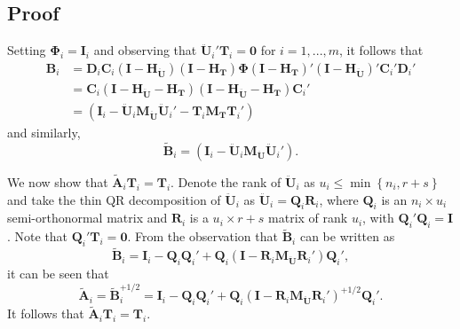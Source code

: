 \documentclass[12pt]{article}
\begin{document}
\hypertarget{proof}{%
\subsection{Proof}\label{proof}}

Setting \(\boldsymbol\Phi_i = \mathbf{I}_i\) and observing that
\(\mathbf{\ddot{U}}_i'\mathbf{T}_i = \mathbf{0}\) for \(i = 1,...,m\),
it follows that \begin{align}
\mathbf{B}_i &= \mathbf{D}_i \mathbf{C}_i \left(\mathbf{I} - \mathbf{H_{\ddot{U}}}\right) \left(\mathbf{I} - \mathbf{H_T}\right) \boldsymbol\Phi \left(\mathbf{I} - \mathbf{H_T}\right)' \left(\mathbf{I} - \mathbf{H_{\ddot{U}}}\right)' \mathbf{C}_i' \mathbf{D}_i' \nonumber \\ 
&= \mathbf{C}_i \left(\mathbf{I} - \mathbf{H_{\ddot{U}}} - \mathbf{H_T}\right) \left(\mathbf{I} - \mathbf{H_{\ddot{U}}} - \mathbf{H_T}\right) \mathbf{C}_i' \nonumber\\ 
\label{eq:B_i}
&= \left(\mathbf{I}_i - \mathbf{\ddot{U}}_i \mathbf{M_{\ddot{U}}}\mathbf{\ddot{U}}_i' - \mathbf{T}_i \mathbf{M_T}\mathbf{T}_i'\right)
\end{align} and similarly, \begin{equation}
\label{eq:Btilde_i}
\tilde{\mathbf{B}}_i = \left(\mathbf{I}_i - \mathbf{\ddot{U}}_i \mathbf{M_{\ddot{U}}}\mathbf{\ddot{U}}_i'\right).
\end{equation}

We now show that \(\tilde{\mathbf{A}}_i \mathbf{T}_i = \mathbf{T}_i\).
Denote the rank of \(\mathbf{\ddot{U}}_i\) as
\(u_i \leq \min \left\{n_i, r + s \right\}\) and take the thin QR
decomposition of \(\mathbf{\ddot{U}}_i\) as
\(\mathbf{\ddot{U}}_i = \mathbf{Q}_i \mathbf{R}_i\), where
\(\mathbf{Q}_i\) is an \(n_i \times u_i\) semi-orthonormal matrix and
\(\mathbf{R}_i\) is a \(u_i \times r + s\) matrix of rank \(u_i\), with
\(\mathbf{Q}_i'\mathbf{Q}_i = \mathbf{I}\). Note that
\(\mathbf{Q}_i'\mathbf{T}_i = \mathbf{0}\). From the observation that
\(\tilde{\mathbf{B}}_i\) can be written as \[
\tilde{\mathbf{B}}_i = \mathbf{I}_i - \mathbf{Q}_i \mathbf{Q}_i' + \mathbf{Q}_i \left(\mathbf{I} - \mathbf{R}_i \mathbf{M}_{\mathbf{\ddot{U}}} \mathbf{R}_i'\right)\mathbf{Q}_i',
\] it can be seen that \begin{equation}
\tilde{\mathbf{A}}_i = \tilde{\mathbf{B}}_i^{+1/2} = \mathbf{I}_i - \mathbf{Q}_i \mathbf{Q}_i' + \mathbf{Q}_i \left(\mathbf{I} - \mathbf{R}_i \mathbf{M}_{\mathbf{\ddot{U}}} \mathbf{R}_i'\right)^{+1/2} \mathbf{Q}_i'.
\end{equation} It follows that
\(\tilde{\mathbf{A}}_i \mathbf{T}_i = \mathbf{T}_i\).
\end{document}
